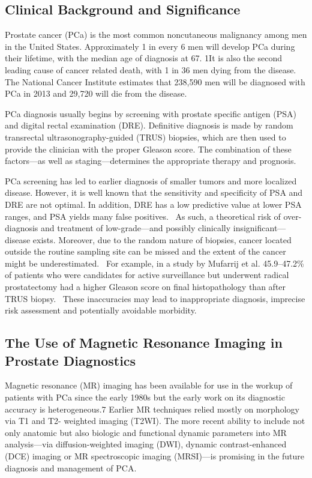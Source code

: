 \subsection{Clinical Background and Significance}
Prostate cancer (PCa) is the most common noncutaneous malignancy among men in
the United States. Approximately 1 in every 6 men will develop PCa during their
lifetime, with the median age of diagnosis at 67. 1It is also the second
leading cause of cancer related death, with 1 in 36 men dying from the disease.
The National Cancer Institute estimates that 238,590 men will be diagnosed with
PCa in 2013 and 29,720 will die from the disease.~\cite{Howlader2010}

PCa diagnosis usually begins by screening with prostate specific antigen (PSA)
and digital rectal examination (DRE).  Definitive diagnosis is made by random
transrectal ultrasonography-guided (TRUS) biopsies, which are then used to
provide the clinician with the proper Gleason score. The combination of these
factors—as well as staging—determines the appropriate therapy and prognosis. 

PCa screening has led to earlier diagnosis of smaller tumors and more localized
disease.  However, it is well known that the sensitivity and specificity of PSA
and DRE are not optimal. In addition, DRE has a low predictive value at lower
PSA ranges, and PSA yields many false
positives.~\cite{Howlader2010,Schroder2000,Gosselaar2006} As such, a
theoretical risk of over-diagnosis and treatment of low-grade—and possibly
clinically insignificant—disease exists. Moreover, due to the random nature of
biopsies, cancer located outside the routine sampling site can be missed and
the extent of the cancer might be underestimated.~\cite{Schroder2000,Gupta2013}
For example, in a study by Mufarrij et al. 45.9--47.2\% of patients who were
candidates for active surveillance but underwent radical prostatectomy had a
higher Gleason score on final histopathology than after TRUS
biopsy.~\cite{Mufarrih2010} These inaccuracies may lead to inappropriate
diagnosis, imprecise risk assessment and potentially avoidable morbidity.

\subsection{The Use of Magnetic Resonance Imaging in Prostate Diagnostics}
Magnetic resonance (MR) imaging has been available for use in the workup of
patients with PCa since the early 1980s but the early work on its diagnostic
accuracy is heterogeneous.7 Earlier MR techniques relied mostly on morphology
via T1 and T2- weighted imaging (T2WI). The more recent ability to include not
only anatomic but also biologic and functional dynamic parameters into MR
analysis—via diffusion-weighted imaging (DWI), dynamic contrast-enhanced (DCE)
imaging or MR spectroscopic imaging (MRSI)—is promising in the future diagnosis
and management of PCA.


